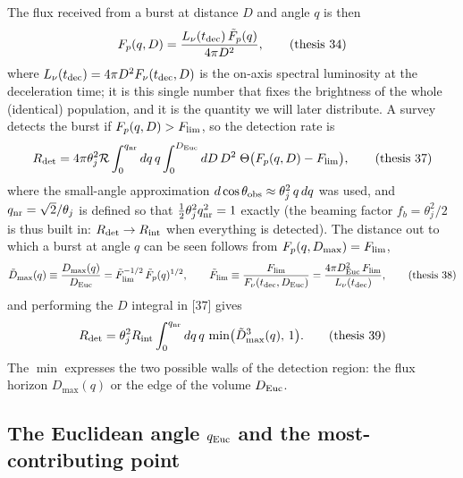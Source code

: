 \documentclass[11pt,a4paper]{article}
\newcommand{\tD}{\tilde{D}}
\newcommand{\tF}{\tilde{F}}
\newcommand{\Euc}{{\rm Euc}}
\newcommand{\nr}{{\rm nr}}
\newcommand{\Flim}{F_{\rm lim}}
\newcommand{\tFlim}{\tilde{F}_{\rm lim}}
\newcommand{\Rint}{R_{\rm int}}
\newcommand{\Rdet}{R_{\rm det}}
\newcommand{\tdec}{t_{\rm dec}}
\newcommand{\Lnu}{L_\nu(t_{\rm dec})}
\begin{document}
The flux received from a burst at distance $D$ and angle $q$ is then
\begin{equation}
F_p(q,D)=\frac{\Lnu\,\tF_p(q)}{4\pi D^2},
\tag{thesis 34}
\end{equation}
where $\Lnu=4\pi D^2F_\nu(\tdec,D)$ is the on-axis spectral luminosity at the deceleration time; it is this single number that fixes the brightness of the whole (identical) population, and it is the quantity we will later distribute. A survey detects the burst if $F_p(q,D)>\Flim$, so the detection rate is
\begin{equation}
\Rdet=4\pi\theta_j^2\mathcal R\int_0^{q_\nr}dq\,q\int_0^{D_\Euc}dD\,D^2\;\Theta\bigl(F_p(q,D)-\Flim\bigr),
\tag{thesis 37}
\end{equation}
where the small-angle approximation $d\cos\theta_{\rm obs}\approx\theta_j^2\,q\,dq$ was used, and $q_\nr=\sqrt2/\theta_j$ is defined so that $\tfrac12\theta_j^2q_\nr^2=1$ exactly (the beaming factor $f_b=\theta_j^2/2$ is thus built in: $\Rdet\to\Rint$ when everything is detected). The distance out to which a burst at angle $q$ can be seen follows from $F_p(q,D_{\max})=\Flim$,
\begin{equation}
\tD_{\max}(q)\equiv\frac{D_{\max}(q)}{D_\Euc}=\tFlim^{-1/2}\,\tF_p(q)^{1/2},\qquad
\tFlim\equiv\frac{\Flim}{F_\nu(\tdec,D_\Euc)}=\frac{4\pi D_\Euc^2\,\Flim}{\Lnu},
\tag{thesis 38}
\end{equation}
and performing the $D$ integral in [37] gives
\begin{equation}
\Rdet=\theta_j^2\Rint\int_0^{q_\nr}dq\,q\,\min\bigl(\tD_{\max}^3(q),\,1\bigr).
\tag{thesis 39}
\end{equation}
The $\min$ expresses the two possible walls of the detection region: the flux horizon $D_{\max}(q)$ or the edge of the volume $D_\Euc$.

\subsection{The Euclidean angle $q_\Euc$ and the most-contributing point}
\end{document}

